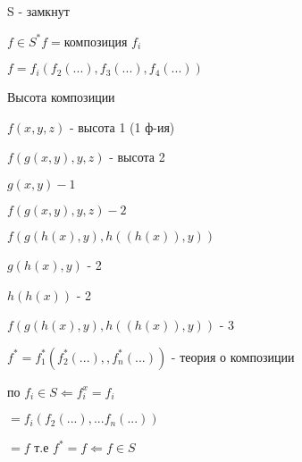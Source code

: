 \documentclass[russian]{lecture-notes}
\begin{document}
	\begin{proposition}

		S - замкнут

		\sqsupset $f \in S^{*} f = $композиция $f_{i}$

		$f = f_{i}(f_{2}(...),f_{3}(...),f_{4}(...))$

		\end{proposition}

	\begin{definition}

		Высота композиции

		$f(x,y,z)$ - высота 1 (1 ф-ия)

		$f(g(x,y),y,z)$ - высота 2

		$g(x,y) - 1$

		$f(g(x,y),y,z) - 2$
		\end{definition}


	\begin{example}
	$f(g(h(x),y),h((h(x)),y))$

	$g(h(x),y)$ - 2

	$h(h(x))$ - 2

	$f(g(h(x),y),h((h(x)),y))$ - 3

	\end{example}

	$f^{*} = f_{1}^{*}(f_{2}^{*}(...),  ,f_{n}^{*}(...))$ - теория о композиции

	по $f_{i} \in S \Leftarrow f_{i}^{x} = f_{i}$

	$= f_{i}(f_{2}(...),...f_{n}(...))$

	$= f$ т.е $f^{*} = f \Leftarrow f \in S$
\end{document}
